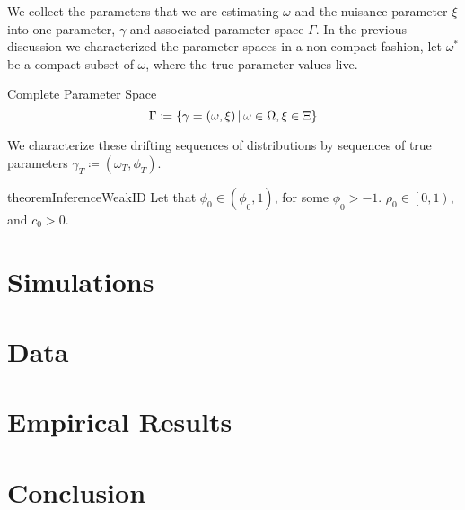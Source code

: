\documentclass[11pt, letterpaper, twoside, final]{article}
\begin{document}
We collect the parameters that we are estimating $\omega$ and the nuisance parameter $\xi$ into one parameter, $\gamma$ and associated parameter space $\Gamma$. In the previous discussion we characterized the parameter spaces in a non-compact fashion, let $\omega^{*}$ be a compact subset of $\omega$, where the true parameter values live.

\begin{defn}{Complete Parameter Space}
  \begin{equation}
    \Gamma \coloneqq \left\lbrace \gamma = (\omega, \xi) \,\middle\vert\, \omega \in \Omega, \xi \in \Xi \right\rbrace 
  \end{equation}
\end{defn}

We characterize these drifting sequences of distributions by sequences of true parameters $\gamma_T \coloneqq (\omega_T, \phi_T)$.  


\begin{restatable}{theorem}{InferenceWeakID}
  Let that $\phi_0 \in \left(\underline{\phi}_0,1\right)$, for some $\underline{\phi}_0 > -1$. 
  $\rho_0 \in \left[0,1\right)$, and $c_0 > 0$. 

\end{restatable}


\section{Simulations}

\section{Data}\label{sec:data}

\section{Empirical Results}

\section{Conclusion}

\newpage

{}
\printbibliography
\newpage
\end{document}
